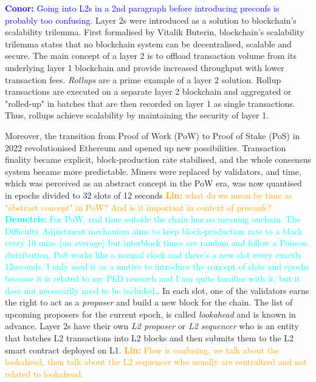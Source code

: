 \documentclass[a4paper]{article}
\theoremstyle{boldstyle}
\newcommand{\cm}[1]{\textcolor{blue}{\textbf{Conor:} #1}}
\newcommand{\lo}[1]{\textcolor{orange}{\textbf{Lin:} #1}}
\newcommand{\dk}[1]{\textcolor{cyan}{\textbf{Demetris:} #1}}
\begin{document}
\cm{Going into L2s in a 2nd paragraph before introducing preconfs is probably too confusing.}
Layer 2s were introduced as a solution to blockchain's scalability trilemma. First formalised by Vitalik Buterin, blockchain's scalability trilemma states that no blockchain system can be decentralised, scalable and secure. The main concept of a layer 2 is to offload transaction volume from its underlying layer 1 blockchain and provide increased throughput with lower transaction fees. \textit{Rollups} are a prime example of a layer 2 solution. Rollup transactions are executed on a separate layer 2 blockchain and aggregated or "rolled-up" in batches that are then recorded on layer 1 as single transactions. Thus, rollups achieve scalability by maintaining the security of layer 1.

Moreover, the transition from Proof of Work (PoW) to Proof of Stake (PoS) in 2022 revolutionised Ethereum and opened up new possibilities. Transaction finality became explicit, block-production rate stabilised, and the whole consensus system became more predictable. Miners were replaced by validators, and time, which was perceived as an abstract concept in the PoW era, was now quantised in epochs divided to 32 slots of 12 seconds \lo{what do we mean by time as "abstract concept" in PoW? And is it important in context of preconfs?} \dk{For PoW, real time outside the chain has no meaning onchain. The Difficulty Adjustment mechanism aims to keep block-production rate to a block every 10 mins (on average) but interblock times are random and follow a Poisson distribution. PoS works like a normal clock and there's a new slot every exactly 12seconds. I only used it as a motive to introduce the concept of slots and epochs because it is related to my PhD research and I am quite familiar with it, but it does not necessarily need to be included.}. In each slot, one of the validators earns the right to act as a \textit{proposer} and build a new block for the chain. The list of upcoming proposers for the current epoch, is called \textit{lookahead} and is known in advance. Layer 2s have their own \textit{L2 proposer} or \textit{L2 sequencer} who is an entity that batches L2 transactions into L2 blocks and then submits them to the L2 smart contract deployed on L1\cite{W:AnatomyofaSlot:Thetumultuous12secondsduringEthereumslots}. \lo{Flow is confusing, we talk about the lookahead, then talk about the L2 sequencer who usually are centralized and not related to lookahead.} 
\end{document}
